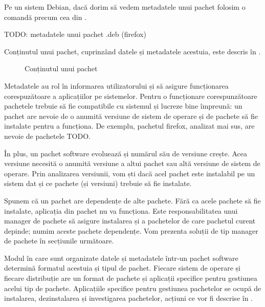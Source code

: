 Pe un sistem Debian, dacă dorim să vedem metadatele unui pachet folosim o comandă precum cea din .

\begin{screen}[caption={Metadatele unui pachet Debian (.deb)},label={lst:sec:metadata}]
TODO: metadatele unui pachet .deb (firefox)
\end{screen}

Conținutul unui pachet, cuprinzând datele și metadatele acestuia, este descris în .

\begin{figure}[htbp]
  \centering
  \def\svgwidth{\columnwidth}
  
  \caption{Conținutul unui pachet}
  \label{fig:package:content}
\end{figure}

Metadatele au rol în informarea utilizatorului și să asigure funcționarea corespuzătoare a aplicațiilor pe sistemelor. Pentru o funcționare corespunzătoare pachetele trebuie să fie compatibile cu sistemul și lucreze bine împreună: un pachet are nevoie de o anumită versiune de sistem de operare și de pachete să fie instalate pentru a funcționa. De exemplu, pachetul firefox, analizat mai sus, are nevoie de pachetele TODO.

În plus, un pachet software evoluează și numărul său de versiune crește. Acea versiune necesită o anumită versiune a altui pachet sau altă versiune de sistem de operare. Prin analizarea versiunii, vom ști dacă acel pachet este instalabil pe un sistem dat și ce pachete (și versiuni) trebuie să fie instalate.

Spunem că un pachet are dependențe de alte pachete. Fără ca acele pachete să fie instalate, aplicația din pachet nu va funcționa. Este responsabilitatea unui manager de pachete să asigure instalarea și a pachetelor de care pachetul curent depinde; numim aceste pachete dependențe. Vom prezenta soluții de tip manager de pachete în secțiunile următoare.

Modul în care sunt organizate datele și metadatele într-un pachet software determină formatul acestuia și tipul de pachet. Fiecare sistem de operare și fiecare distribuție are un format de pachete și aplicații specifice pentru gestiunea acelui tip de pachete. Aplicațiile specifice pentru gestiunea pachetelor se ocupă de instalarea, dezinstalarea și investigarea pachetelor, acțiuni ce vor fi descrise în .

